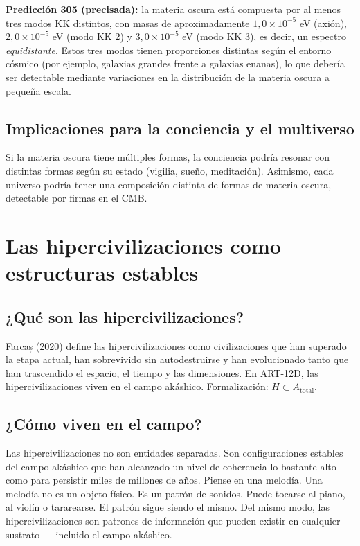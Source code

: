 \textbf{Predicción 305 (precisada):} la materia oscura está compuesta por al menos tres modos KK distintos, con masas de aproximadamente $1,0\times10^{-5}$ eV (axión), $2,0\times10^{-5}$ eV (modo KK 2) y $3,0\times10^{-5}$ eV (modo KK 3), es decir, un espectro \emph{equidistante}. Estos tres modos tienen proporciones distintas según el entorno cósmico (por ejemplo, galaxias grandes frente a galaxias enanas), lo que debería ser detectable mediante variaciones en la distribución de la materia oscura a pequeña escala.

\subsection{Implicaciones para la conciencia y el multiverso}
Si la materia oscura tiene múltiples formas, la conciencia podría resonar con distintas formas según su estado (vigilia, sueño, meditación). Asimismo, cada universo podría tener una composición distinta de formas de materia oscura, detectable por firmas en el CMB.

\section{Las hipercivilizaciones como estructuras estables}
\subsection{¿Qué son las hipercivilizaciones?}
Farcaș (2020) define las hipercivilizaciones como civilizaciones que han superado la etapa actual, han sobrevivido sin autodestruirse y han evolucionado tanto que han trascendido el espacio, el tiempo y las dimensiones. En ART-12D, las hipercivilizaciones viven en el campo akáshico. Formalización: $H \subset A_{\text{total}}$.

\subsection{¿Cómo viven en el campo?}
Las hipercivilizaciones no son entidades separadas. Son configuraciones estables del campo akáshico que han alcanzado un nivel de coherencia lo bastante alto como para persistir miles de millones de años. Piense en una melodía. Una melodía no es un objeto físico. Es un patrón de sonidos. Puede tocarse al piano, al violín o tararearse. El patrón sigue siendo el mismo. Del mismo modo, las hipercivilizaciones son patrones de información que pueden existir en cualquier sustrato --- incluido el campo akáshico.

